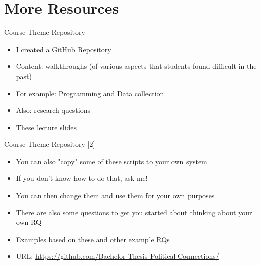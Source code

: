 \documentclass[aspectratio = 169, 12pt]{beamer}
\begin{document}
\section{More Resources}

    \begin{frame}{Course Theme Repository}
        \begin{itemize}
        \item I created a \href{https://github.com/Bachelor-Thesis-Political-Connections}{GitHub Repository}
        \item Content: walkthroughs (of various aspects that students found difficult in the past)
        \item For example: Programming and Data collection
        \item Also: research questions
        \item These lecture slides
        \end{itemize}
    \end{frame}
    
    \begin{frame}{Course Theme Repository [2]}
        \begin{itemize}
            \item You can also "copy" some of these scripts to your own system
            \item If you don't know how to do that, ask me!
            \item You can then change them and use them for your own purposes
            \item There are also some questions to get you started about thinking about your own RQ
            \item Examples based on these and other example RQs
            \item URL: \href{https://github.com/Bachelor-Thesis-Political-Connections/}{https://github.com/Bachelor-Thesis-Political-Connections/}
        \end{itemize}
    \end{frame}
\end{document}
